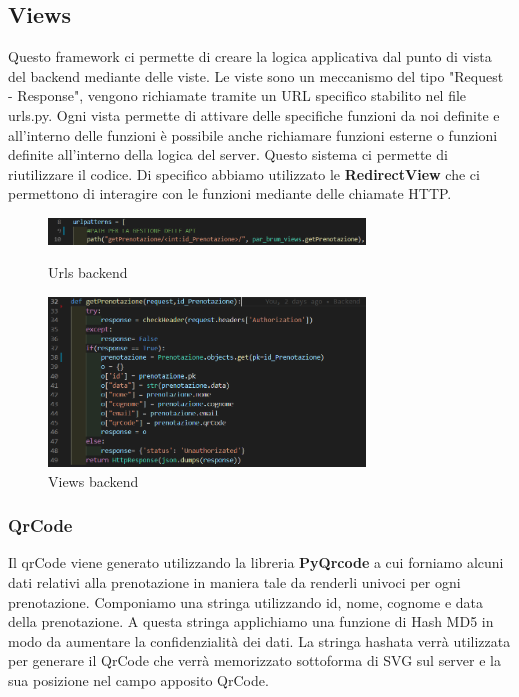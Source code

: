 \documentclass[a4paper,11pt]{report}
\begin{document}
\subsection{Views}
Questo framework ci permette di creare la logica applicativa dal punto di vista del backend mediante delle viste. Le viste sono un meccanismo del tipo "Request - Response", vengono richiamate tramite un URL specifico stabilito nel file urls.py. Ogni vista permette di attivare delle specifiche funzioni da noi definite e all'interno delle funzioni è possibile anche richiamare funzioni esterne o funzioni definite all'interno della logica del server. Questo sistema ci permette di riutilizzare il codice. Di specifico abbiamo utilizzato le \textbf{RedirectView} che ci permettono di interagire con le funzioni mediante delle chiamate HTTP.
\begin{figure}[H]
    \centering
	\includegraphics[width=0.75\textwidth]{urls_py.png}
    \caption{Urls backend}
    \label{fig:urlsBackend}
	\vspace{0.5cm}
   	 \includegraphics[width=0.75\textwidth]{views_py.png}
    \caption{Views backend}
    \label{fig:viewsBackend}
\end{figure}

\subsubsection{QrCode}
Il qrCode viene generato utilizzando la libreria \textbf{PyQrcode} a cui forniamo alcuni dati relativi alla prenotazione in maniera tale da renderli univoci per ogni prenotazione. Componiamo una stringa utilizzando id, nome, cognome e data della prenotazione.
A questa stringa applichiamo una funzione di Hash MD5 in modo da aumentare la confidenzialità dei dati. La stringa hashata verrà utilizzata per generare il QrCode che verrà memorizzato sottoforma di SVG sul server e la sua posizione nel campo apposito QrCode.
\end{document}
